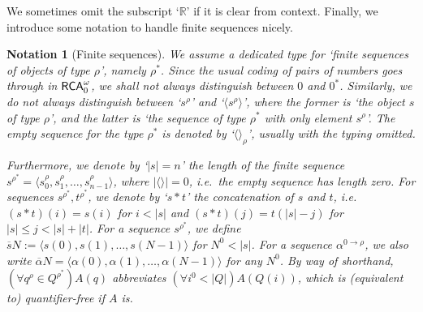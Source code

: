 \documentclass[reqno]{amsart}
\newtheorem{nota}[thm]{Notation}
\def\RCAo{\textup{\textsf{RCA}}_{0}^{\omega}}
\def\R{{\mathbb  R}}
\def\di{\rightarrow}
\numberwithin{equation}{section}
\numberwithin{thm}{section}
\begin{document}
We sometimes omit the subscript `$\R$' if it is clear from context.  
Finally, we introduce some notation to handle finite sequences nicely.  
\begin{nota}[Finite sequences]\label{skim}\rm
We assume a dedicated type for `finite sequences of objects of type $\rho$', namely $\rho^{*}$.  Since the usual coding of pairs of numbers goes through in $\RCAo$, we shall not always distinguish between $0$ and $0^{*}$. 
Similarly, we do not always distinguish between `$s^{\rho}$' and `$\langle s^{\rho}\rangle$', where the former is `the object $s$ of type $\rho$', and the latter is `the sequence of type $\rho^{*}$ with only element $s^{\rho}$'.  The empty sequence for the type $\rho^{*}$ is denoted by `$\langle \rangle_{\rho}$', usually with the typing omitted.  

\smallskip

Furthermore, we denote by `$|s|=n$' the length of the finite sequence $s^{\rho^{*}}=\langle s_{0}^{\rho},s_{1}^{\rho},\dots,s_{n-1}^{\rho}\rangle$, where $|\langle\rangle|=0$, i.e.\ the empty sequence has length zero.
For sequences $s^{\rho^{*}}, t^{\rho^{*}}$, we denote by `$s*t$' the concatenation of $s$ and $t$, i.e.\ $(s*t)(i)=s(i)$ for $i<|s|$ and $(s*t)(j)=t(|s|-j)$ for $|s|\leq j< |s|+|t|$. For a sequence $s^{\rho^{*}}$, we define $\overline{s}N:=\langle s(0), s(1), \dots,  s(N-1)\rangle $ for $N^{0}<|s|$.  
For a sequence $\alpha^{0\di \rho}$, we also write $\overline{\alpha}N=\langle \alpha(0), \alpha(1),\dots, \alpha(N-1)\rangle$ for \emph{any} $N^{0}$.  By way of shorthand, 
$(\forall q^{\rho}\in Q^{\rho^{*}})A(q)$ abbreviates $(\forall i^{0}<|Q|)A(Q(i))$, which is (equivalent to) quantifier-free if $A$ is.   
\end{nota}
\end{document}
